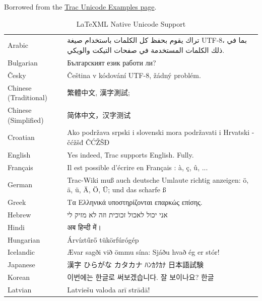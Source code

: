 \documentclass{article}
\begin{document}
Borrowed from the \href{http://trac.edgewall.org/wiki/TracUnicode}{Trac Unicode Examples page}.
\begin{table}\caption{LaTeXML Native Unicode Support}
\begin{tabular}{|ll|}\hline
Arabic & تراك يقوم بحفظ كل الكلمات باستخدام صيغة UTF-8، بما في ذلك الكلمات المستخدمة في صفحات التيكت والويكي.\\

Bulgarian & Българският език работи ли?\\

Česky & Čeština v kódování UTF-8, žádný problém.\\

Chinese (Traditional) & 繁體中文, 漢字測試;\\

Chinese (Simplified) & 简体中文，汉字测试 \\

Croatian & Ako podržava srpski i slovenski mora podržavati i Hrvatski - čćžšđ ČĆŽŠĐ\\

English & Yes indeed, Trac supports English. Fully.\\

Français & Il est possible d'écrire en Français : à, ç, û, ...\\

German & Trac-Wiki muß auch deutsche Umlaute richtig anzeigen: ö, ä, ü, Ä, Ö, Ü; und das scharfe ß\\

Greek & Τα Ελληνικά υποστηρίζονται επαρκώς επίσης.\\

Hebrew & אני יכול לאכול זכוכית וזה לא מזיק לי\\

Hindi & अब हिन्दी में।\\

Hungarian & Árvíztűrő tükörfúrógép\\

Icelandic & Ævar sagði við ömmu sína: Sjáðu hvað ég er stór!\\

Japanese & 漢字 ひらがな カタカナ ﾊﾝｶｸｶﾅ 日本語試験\\

Korean & 이번에는 한글로 써보겠습니다. 잘 보이나요? 한글\\

Latvian & Latviešu valoda arī strādā!\\


\end{tabular}
\end{table}
\end{document}
